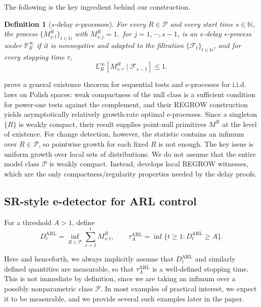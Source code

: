 \documentclass[12pt]{article}
\theoremstyle{spaced}
\newtheorem{definition}[definition]{Definition}
\theoremstyle{remark}
\newcommand{\N}{\mathbb N}
\newcommand{\calP}{\mathcal P}
\newcommand{\calF}{\mathcal F}
\newcommand{\Pinf}[1]{\mathbb P_{#1}^{\infty}}
\newcommand{\Einf}[1]{\mathbb E_{#1}^{\infty}}
\begin{document}
The following is the key ingredient behind our construction.

\begin{definition}[$s$-delay e-processes]\label{ass:eprocess}
For every $R\in\calP$ and every start time $s\in\N$, the process $\{M_{s:t}^R\}_{t\in\N}$
with $M_{s:j}^R=1,$ for $j=1,\cdots,s-1$, is an $s$-delay e-process under $\Pinf{R}$ if it is nonnegative and adapted to the filtration $\{\calF_{t}\}_{t\in\N}$, and for every stopping time $\tau$, 
\[
  \Einf{R}\!\left[M_{s:\tau}^R\mid \calF_{s-1}\right]\le 1.
\]
\end{definition}

 \cite{ram2026power} prove a general existence theorem for sequential tests and e-processes for i.i.d. laws on Polish spaces: weak compactness of the null class is a sufficient condition for power-one tests against the complement, and their REGROW construction yields asymptotically relatively growth-rate optimal e-processes. 
 Since a singleton $\{R\}$ is weakly compact, their result supplies point-null primitives $M^R$ at the level of existence.  For change detection, however, the statistic contains an infimum over $R\in\calP$, so pointwise growth for each fixed $R$ is not enough.
 The key issue is uniform growth over local sets of distributions.  We do not assume that the entire model class $\calP$ is weakly compact.  Instead,  develops local REGROW witnesses, which are the only compactness/regularity properties needed by the delay proofs.

\subsection{SR-style e-detector for ARL control}

For a threshold $A>1$, define
\begin{equation}\label{eq:ordinary-arl-detector}
  D_t^{\mathrm{ARL}}
  =
  \inf_{R\in\calP}\sum_{s=1}^t M_{s:t}^R,
  \qquad
  \tau_A^{\mathrm{ARL}}
  =
  \inf\{t\ge1:D_t^{\mathrm{ARL}}\ge A\}.
\end{equation}

Here and henceforth, we always implicitly assume that $D_t^{\mathrm{ARL}}$ and similarly defined quantities are measurable, so that $\tau_A^{\mathrm{ARL}}$ is a well-defined stopping time. This is not immediate by definition, since we are taking an infimum over a possibly nonparametric class $\calP$. In most examples of practical interest, we expect it to be measurable, and we provide several such examples later in the paper.
\end{document}
